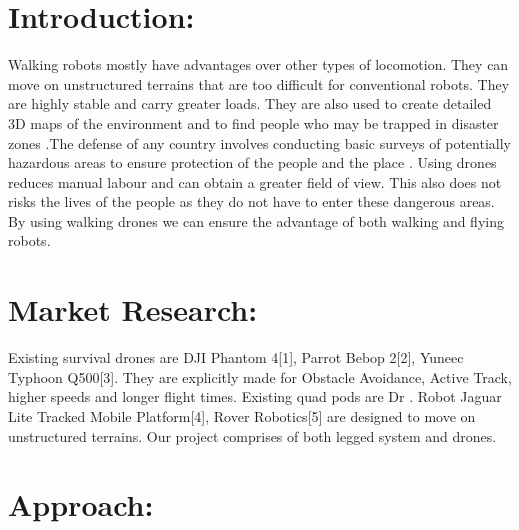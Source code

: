 \documentclass{article}
\begin{document}
    \begin{normalsize}
    
    	\section*{Introduction:}
        
        Walking robots mostly have advantages over other types of locomotion. They can move on unstructured terrains that are too difficult for conventional robots. They are highly stable and carry greater loads. They are also used to create detailed 3D maps of the environment and to find people who may be trapped in disaster zones .The defense of any country involves conducting basic surveys of potentially hazardous areas to ensure protection of the people and the place . Using drones reduces manual labour and can obtain a greater field of view. This also does not risks the lives of the people as they do not have to enter these dangerous areas. By using walking drones we can ensure the advantage of both walking and flying robots.   \\
      
		\section*{Market Research:}
        
       Existing survival drones are DJI Phantom 4[1], Parrot Bebop 2[2], Yuneec Typhoon Q500[3]. They are explicitly made for Obstacle Avoidance, Active Track, higher speeds and longer flight times. Existing quad pods are Dr . Robot Jaguar Lite Tracked Mobile Platform[4], Rover Robotics[5] are designed to move on unstructured terrains. Our project comprises of both legged system and drones.\\
        
	   	\section*{Approach:}
        

\end{normalsize}
\end{document}
